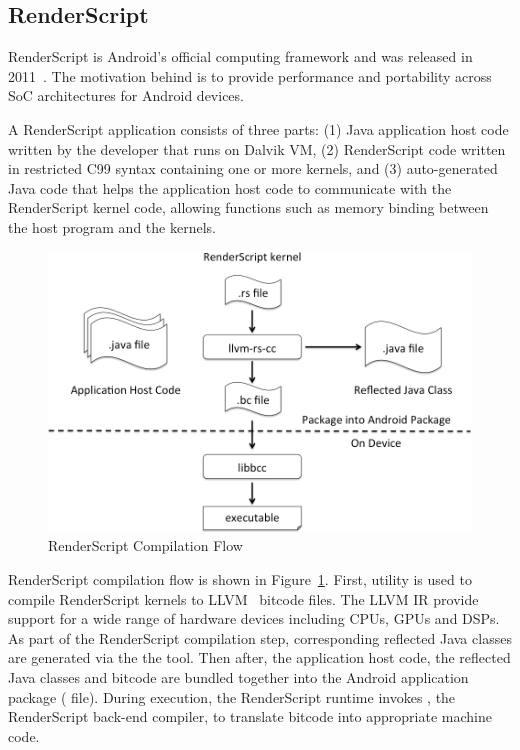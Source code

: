 
\subsection{RenderScript}
RenderScript is Android's official computing framework and was released in 
2011~\cite{RenderScript}. The motivation behind is to provide
performance and portability across SoC architectures for Android devices.

A RenderScript application consists of three parts: (1) Java application host
code written by the developer that runs on Dalvik VM, (2) RenderScript code
written in restricted C99 syntax containing one or more kernels, and (3)
auto-generated Java code that helps the application host code to communicate with
the RenderScript kernel code, allowing functions such as memory binding between the
host program and the kernels.

\begin{figure}
\centering
\includegraphics[scale=0.28]{figs/renderscript-compile.png}
\caption{RenderScript Compilation Flow}
\label{fig:RSCompilation}
\centering
\end{figure}

RenderScript compilation flow is shown in Figure~\ref{fig:RSCompilation}.
First,  utility is used to compile RenderScript kernels to
LLVM~\cite{LLVM:CGO04} bitcode files. The LLVM IR provide support for a wide range of hardware
devices including CPUs, GPUs and DSPs. 
As part of the RenderScript compilation step, corresponding reflected Java classes
are generated via the  the  tool.
Then after, the application host code, the reflected Java classes and bitcode
are bundled together into the Android application package ( file).
During execution, the RenderScript
runtime invokes , the RenderScript back-end compiler, to translate
bitcode into appropriate machine code.


